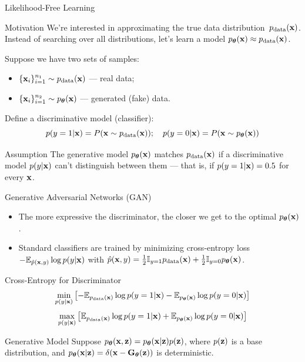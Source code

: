 \documentclass{beamer}
\renewcommand{\eqpause}{}
\begin{document}
\begin{frame}{Likelihood-Free Learning}
	\begin{block}{Motivation}
	 We're interested in approximating the true data distribution~$p_{\text{data}}(\mathbf{x})$.
	Instead of searching over all distributions, let's learn a model $p_{\boldsymbol{\theta}}(\mathbf{x}) \approx p_{\text{data}}(\mathbf{x})$.
	\end{block}
	\eqpause
	Suppose we have two sets of samples: 
	\begin{itemize}
		\item $\{\mathbf{x}_i\}_{i=1}^{n_1} \sim p_{\text{data}}(\mathbf{x})$ — real data;
		\item $\{\mathbf{x}_i\}_{i=1}^{n_2} \sim p_{\boldsymbol{\theta}}(\mathbf{x})$ — generated (fake) data.
	\end{itemize}
	\eqpause
	Define a discriminative model (classifier):
	\[
		p(y = 1 | \mathbf{x}) = P(\mathbf{x} \sim p_{\text{data}}(\mathbf{x})); \quad p(y = 0 | \mathbf{x}) = P(\mathbf{x} \sim p_{\boldsymbol{\theta}}(\mathbf{x}))
	\]
	\eqpause
	\vspace{-0.5cm}
	\begin{block}{Assumption}
		The generative model $p_{\boldsymbol{\theta}}(\mathbf{x})$ matches $p_{\text{data}}(\mathbf{x})$ if a discriminative model $p(y | \mathbf{x})$ can't distinguish between them --- that is, if $p(y = 1 | \mathbf{x}) = 0.5$ for every $\mathbf{x}$.
	\end{block}
\end{frame}
\begin{frame}{Generative Adversarial Networks (GAN)}
	\begin{itemize}
		\item The more expressive the discriminator, the closer we get to the optimal $p_{\boldsymbol{\theta}}(\mathbf{x})$.
		\item Standard classifiers are trained by minimizing cross-entropy loss $-\mathbb{E}_{\hat{p}(\mathbf{x}, y)} \log p(y | \mathbf{x})$ with $\hat{p}(\mathbf{x}, y) = \frac{1}{2} \mathbb{I}_{y=1}p_{\text{data}}(\mathbf{x}) + \frac{1}{2} \mathbb{I}_{y=0}p_{\boldsymbol{\theta}}(\mathbf{x})$.
	\end{itemize}
	\eqpause
	\begin{block}{Cross-Entropy for Discriminator}
		\vspace{-0.3cm}
		\[
			\min_{p(y | \mathbf{x})} \left[ - \mathbb{E}_{p_{\text{data}}(\mathbf{x})} \log p(y = 1 | \mathbf{x}) - \mathbb{E}_{p_{\boldsymbol{\theta}}(\mathbf{x})} \log p(y = 0 | \mathbf{x}) \right] 
		\]
		\[
			\max_{p(y | \mathbf{x})} \left[\mathbb{E}_{p_{\text{data}}(\mathbf{x})} \log p(y = 1 | \mathbf{x}) + \mathbb{E}_{p_{\boldsymbol{\theta}}(\mathbf{x})} \log p(y = 0 | \mathbf{x}) \right] 
		\]
	\end{block}
	\eqpause
	\vspace{-0.3cm}
	\begin{block}{Generative Model}
		Suppose $p_{\boldsymbol{\theta}}(\mathbf{x}, \mathbf{z}) = p_{\boldsymbol{\theta}}(\mathbf{x}| \mathbf{z}) p(\mathbf{z})$, where $p(\mathbf{z})$ is a base distribution, and $p_{\boldsymbol{\theta}}(\mathbf{x} | \mathbf{z}) = \delta (\mathbf{x} - \mathbf{G}_{\boldsymbol{\theta}}(\mathbf{z}))$ is deterministic.
	\end{block}
\end{frame}
\end{document}
